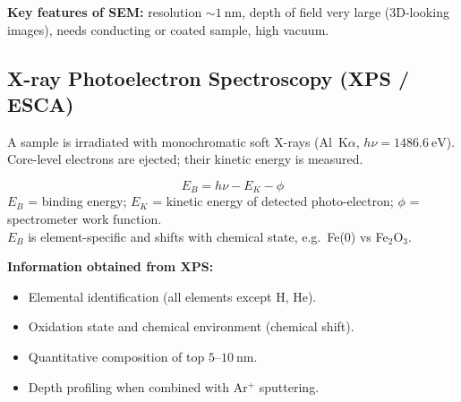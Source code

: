 \documentclass[12pt,a4paper]{article}
\begin{document}
\begin{tcolorbox}[tikzbox, title={Block Diagram of an SEM}]
\centering
{}
\end{tcolorbox}

\textbf{Key features of SEM:} resolution $\sim 1\ \mathrm{nm}$, depth of field very large (3D-looking images), needs conducting or coated sample, high vacuum.

\subsection{X-ray Photoelectron Spectroscopy (XPS / ESCA)}
A sample is irradiated with monochromatic soft X-rays (Al~K$\alpha$, $h\nu=1486.6\ \mathrm{eV}$). Core-level electrons are ejected; their kinetic energy is measured.

\begin{tcolorbox}[formulabox, title={XPS Energy-Conservation Equation}]
\[
E_{B}=h\nu - E_{K} - \phi
\]
$E_B$ = binding energy; $E_K$ = kinetic energy of detected photo-electron; $\phi$ = spectrometer work function.\\
$E_B$ is element-specific and shifts with chemical state, e.g.\ Fe(0) vs Fe$_2$O$_3$.
\end{tcolorbox}

\textbf{Information obtained from XPS:}
\begin{itemize}[leftmargin=*, itemsep=1pt, topsep=2pt]
  \item Elemental identification (all elements except H, He).
  \item Oxidation state and chemical environment (chemical shift).
  \item Quantitative composition of top $5$--$10\ \mathrm{nm}$.
  \item Depth profiling when combined with Ar$^{+}$ sputtering.
\end{itemize}
\end{document}
